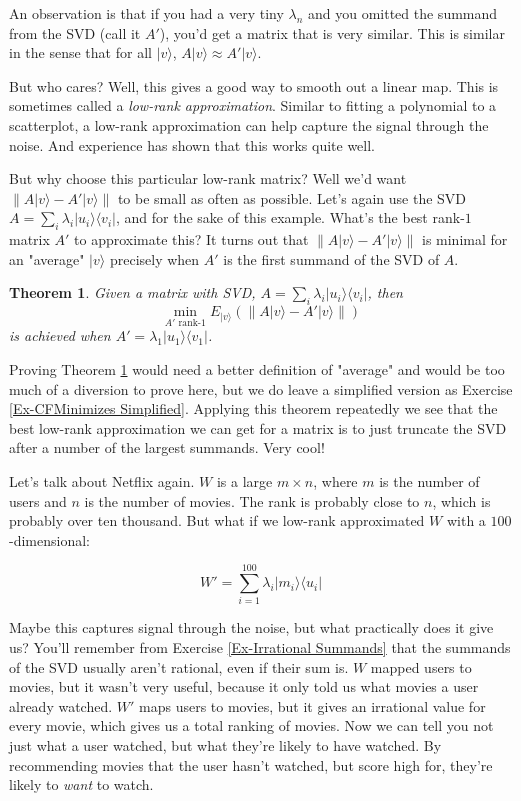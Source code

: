 \documentclass{amsbook}
\newtheorem{theorem}{Theorem}
\begin{document}
An observation is that if you had a very tiny $\lambda_n$ and you omitted the summand from the SVD (call it $A'$), you'd get a matrix that is very similar.  This is similar in the sense that for all $|v\rangle$, $A|v\rangle\approx A'|v\rangle$.

But who cares?  Well, this gives a good way to smooth out a linear map.  This is sometimes called a {\em low-rank approximation}.  Similar to fitting a polynomial to a scatterplot, a low-rank approximation can help capture the signal through the noise.  And experience has shown that this works quite well.

But why choose this particular low-rank matrix?  Well we'd want $\left\|A|v\rangle-A'|v\rangle\right\|$ to be small as often as possible.  Let's again use the SVD $A=\sum_i\lambda_i|u_i\rangle\langle v_i|$, and for the sake of this example.  What's the best rank-$1$ matrix $A'$ to approximate this?  It turns out that $\left\|A|v\rangle-A'|v\rangle\right\|$ is minimal for an "average" $|v\rangle$ precisely when $A'$ is the first summand of the SVD of $A$.

\begin{theorem}
\label{CFMinimizes}
Given a matrix with SVD, $A=\sum_i\lambda_i|u_i\rangle\langle v_i|$, then 
$$
\min_{A'\text{ rank-$1$}}E_{|v\rangle}\left(\left\|A|v\rangle-A'|v\rangle\right\|\right)
$$
is achieved when $A'=\lambda_1|u_1\rangle\langle v_1|$.
\end{theorem}

Proving Theorem \ref{CFMinimizes} would need a better definition of "average" and would be too much of a diversion to prove here, but we do leave a simplified version as Exercise \ref{Ex-CFMinimizes Simplified}.  Applying this theorem repeatedly we see that the best low-rank approximation we can get for a matrix is to just truncate the SVD after a number of the largest summands.  Very cool!

Let's talk about Netflix again.  $W$ is a large $m\times n$, where $m$ is the number of users and $n$ is the number of movies.  The rank is probably close to $n$, which is probably over ten thousand.  But what if we low-rank approximated $W$ with a $100$-dimensional:

$$
W'=\sum_{i=1}^{100}\lambda_i|m_i\rangle\langle u_i|
$$

Maybe this captures signal through the noise, but what practically does it give us?  You'll remember from Exercise \ref{Ex-Irrational Summands} that the summands of the SVD usually aren't rational, even if their sum is.  $W$ mapped users to movies, but it wasn't very useful, because it only told us what movies a user already watched.  $W'$ maps users to movies, but it gives an irrational value for every movie, which gives us a total ranking of movies.  Now we can tell you not just what a user watched, but what they're likely to have watched.  By recommending movies that the user hasn't watched, but score high for, they're likely to {\em want} to watch.
\end{document}
